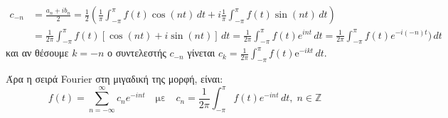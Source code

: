        \begin{align*}
         c_{-n} &= \frac{a_{n}+ib_{n}}{2} = \frac{1}{2} 
         \left(\frac{1}{\pi} \int _{- \pi }^{\pi } f(t) \cos{(nt)} \,{dt} + i
         \frac{1}{\pi} \int _{- \pi }^{\pi } f(t) \sin{(nt)} \,{dt}  \right) \\ 
                &= \frac{1}{2 \pi} \int _{- \pi }^{\pi} f(t) [\cos{(nt)} + i \sin{(nt)}] 
                \,{dt} = \frac{1}{2 \pi} \int _{- \pi }^{\pi } f(t) e^{int} \,{dt} = 
                \frac{1}{2 \pi} \int _{- \pi }^{\pi } f(t) e^{-i(-n)t}) \,{dt} 
       \end{align*}
       και αν θέσουμε $ k=-n $ ο συντελεστής $ c_{-n} $ γίνεται $ c_{k} =
       \frac{1}{2 \pi} \int _{- \pi }^{\pi} f(t) \mathrm{e}^{-ikt}\,{dt} $.

       Άρα η σειρά Fourier στη μιγαδική της μορφή, είναι:
       \[
         \boxed{f(t) = \sum_{n=- \infty}^{\infty} c_{n} e^{-int} \quad \text{με} \quad c_{n} =
         \frac{1}{2 \pi} \int _{- \pi}^{\pi } f(t) e^{-int} \,{dt}, \; n \in \mathbb{Z}}
       \]




       



